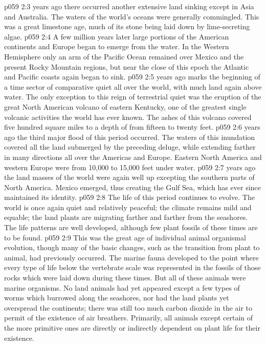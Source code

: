 \pc \vs p059 2:3  years ago there occurred another extensive land sinking except in Asia and Australia. The waters of the world’s oceans were generally commingled. This was a great limestone age, much of its stone being laid down by lime\hyp{}secreting algae.
\vs p059 2:4 A few million years later large portions of the American continents and Europe began to emerge from the water. In the Western Hemisphere only an arm of the Pacific Ocean remained over Mexico and the present Rocky Mountain regions, but near the close of this epoch the Atlantic and Pacific coasts again began to sink.
\pc \vs p059 2:5  years ago marks the beginning of a time sector of comparative quiet all over the world, with much land again above water. The only exception to this reign of terrestrial quiet was the eruption of the great North American volcano of eastern Kentucky, one of the greatest single volcanic activities the world has ever known. The ashes of this volcano covered five hundred square miles to a depth of from fifteen to twenty feet.
\pc \vs p059 2:6  years ago the third major flood of this period occurred. The waters of this inundation covered all the land submerged by the preceding deluge, while extending farther in many directions all over the Americas and Europe. Eastern North America and western Europe were from 10,000 to 15,000 feet under water.
\pc \vs p059 2:7  years ago the land masses of the world were again well up excepting the southern parts of North America. Mexico emerged, thus creating the Gulf Sea, which has ever since maintained its identity.
\vs p059 2:8 The life of this period continues to evolve. The world is once again quiet and relatively peaceful; the climate remains mild and equable; the land plants are migrating farther and farther from the seashores. The life patterns are well developed, although few plant fossils of these times are to be found.
\pc \vs p059 2:9 This was the great age of individual animal organismal evolution, though many of the basic changes, such as the transition from plant to animal, had previously occurred. The marine fauna developed to the point where every type of life below the vertebrate scale was represented in the fossils of those rocks which were laid down during these times. But all of these animals were marine organisms. No land animals had yet appeared except a few types of worms which burrowed along the seashores, nor had the land plants yet overspread the continents; there was still too much carbon dioxide in the air to permit of the existence of air breathers. Primarily, all animals except certain of the more primitive ones are directly or indirectly dependent on plant life for their existence.
